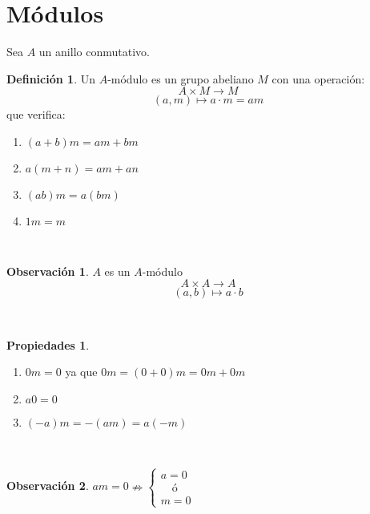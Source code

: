 \documentclass{article}
\theoremstyle{theorem-style}  %
\theoremstyle{definition}
\newtheorem{definition}{Definición}[section]
\newtheorem*{observation}{Observación} %
\newtheorem*{properties}{Propiedades}
\theoremstyle{example-style}
\begin{document}


\newpage
\tableofcontents
\newpage


\section{Módulos}
	Sea $A$ un anillo conmutativo.
	\begin{definition}
        	Un $A$-módulo es un grupo abeliano $M$ con una operación:
        	\[A\times M\longrightarrow M \]
        	\[(a,m) \longmapsto a\cdot m =am\]
        	que verifica:
        	\begin{enumerate}[\hspace{1cm}i)]
        		\item $(a+b)m = am+bm$
        		\item $a(m+n)=am+an$
        		\item $(ab)m = a(bm)$
        		\item $1m=m$
        	\end{enumerate}
	\end{definition}
	\ 

	\begin{observation}
	    	$A$ es un $A$-módulo
	    	\[A\times A\longrightarrow A \]
	    	\[(a,b) \longmapsto a\cdot b\]
	\end{observation}
	\ 

	\begin{properties}
		\
	    	\begin{enumerate}
	    		\item $0m=0$ ya que $0m=(0+0)m=0m+0m$
	    		\item $a0=0$
	    		\item $(-a)m=-(am)=a(-m)$
		\end{enumerate}
	\end{properties}
	\ 

	\begin{observation}
		$am=0 \nRightarrow \begin{cases}
		a=0\\
		\quad\text{ó}\\
		m=0
		\end{cases}$
	\end{observation}
	\ 
\end{document}
